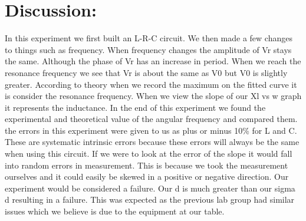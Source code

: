 \documentclass{article}
\begin{document}
\section*{Discussion:}
\doublespace
In this experiment we first built an L-R-C circuit.  We then made a few changes to things such as frequency.  When frequency changes the amplitude of Vr stays the same.  Although the phase of Vr has an increase in period.  When we reach the resonance frequency we see that Vr is about the same as V0 but V0 is slightly greater.  According to theory when we record the maximum on the fitted curve it is consider the resonance frequency.  When we view the slope of our Xl vs w graph it represents the inductance.  In the end of this experiment we found the experimental and theoretical value of the angular frequency and compared them.  the errors in this experiment were given to us as plus or minus 10\% for L and C.  These are systematic intrinsic errors because these errors will always be the same when using this circuit.  If we were to look at the error of the slope it would fall into random errors in measurement.  This is because we took the measurement ourselves and it could easily be skewed in a positive or negative direction.  Our experiment would be considered a failure.  Our d is much greater than our sigma d resulting in a failure.  This was expected as the previous lab group had similar issues which we believe is due to the equipment at our table.
  
  


\singlespace
\newpage
\end{document}
